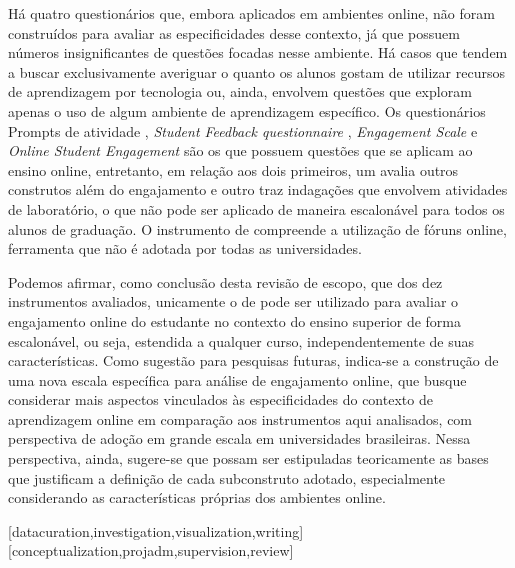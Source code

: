 \documentclass[portuguese]{textolivre}
\begin{document}
Há quatro questionários que, embora aplicados em ambientes online, não foram construídos para avaliar as especificidades desse contexto, já que possuem números insignificantes de questões focadas nesse ambiente. Há casos que tendem a buscar exclusivamente averiguar o quanto os alunos gostam de utilizar recursos de aprendizagem por tecnologia ou, ainda, envolvem questões que exploram apenas o uso de algum ambiente de aprendizagem específico.
Os questionários Prompts de atividade \cite{walker2021}, \emph{Student Feedback questionnaire} \cite{rajabalee2021}, \emph{Engagement Scale} \cite{sun2012} e \emph{Online Student Engagement} \cite{dixson2015} são os que possuem questões que se aplicam ao ensino online, entretanto, em relação aos dois primeiros, um avalia outros construtos além do engajamento e outro traz indagações que envolvem atividades de laboratório, o que não pode ser aplicado de maneira escalonável para  todos os alunos de graduação. O instrumento de \textcite{dixson2015} compreende a utilização de fóruns online, ferramenta que não é adotada por todas as universidades.

Podemos afirmar, como conclusão desta revisão de escopo, que dos dez instrumentos avaliados, unicamente o de \textcite{sun2012} pode ser utilizado para avaliar o engajamento online do estudante no contexto do ensino superior de forma escalonável, ou seja, estendida a qualquer curso, independentemente de suas características. Como sugestão para pesquisas futuras, indica-se a construção de uma nova escala específica para análise de engajamento online, que busque considerar mais aspectos vinculados às especificidades do contexto de aprendizagem online em comparação aos instrumentos aqui analisados, com perspectiva de adoção em grande escala em universidades brasileiras. Nessa perspectiva, ainda, sugere-se que possam ser estipuladas teoricamente as bases que justificam a definição de cada subconstruto adotado, especialmente considerando as características próprias dos ambientes online.

\printbibliography\label{sec-bib}


\begin{contributors}
[datacuration,investigation,visualization,writing]
[conceptualization,projadm,supervision,review]
\end{contributors}
\end{document}
